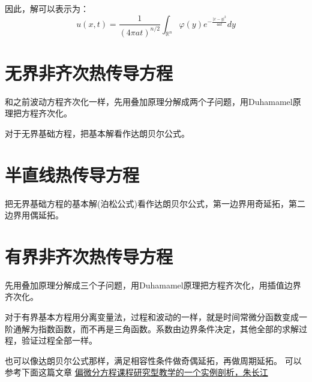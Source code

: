 \documentclass[12pt,a4paper]{article}
\numberwithin{subsection}{section}   %
\numberwithin{subsubsection}{subsection}
\theoremstyle{plain}
\theoremstyle{definition}
\theoremstyle{remark}
\theoremstyle{remark}
\begin{document}
	
	
	
	
	因此，解可以表示为：
	\begin{equation}
		u(x, t) = \frac{1}{(4\pi a t)^{n/2}} \int_{\mathbb{R}^n} \varphi(y) e^{-\frac{|x - y|^2}{4a t}} dy
	\end{equation}
	

	
		\newpage
	\section{无界非齐次热传导方程}
	和之前波动方程齐次化一样，先用叠加原理分解成两个子问题，用Duhamamel原理把方程齐次化。
	
	对于无界基础方程，把基本解看作达朗贝尔公式。
	
	\section{半直线热传导方程}
	把无界基础方程的基本解(泊松公式)看作达朗贝尔公式，第一边界用奇延拓，第二边界用偶延拓。
	
	
	\section{有界非齐次热传导方程}
	先用叠加原理分解成三个子问题，用Duhamamel原理把方程齐次化，用插值边界齐次化。
	
	对于有界基本方程用分离变量法，过程和波动的一样，就是时间常微分函数变成一阶通解为指数函数，而不再是三角函数。系数由边界条件决定，其他全部的求解过程，验证过程全部一样。
	
	也可以像达朗贝尔公式那样，满足相容性条件做奇偶延拓，再做周期延拓。
	可以参考下面这篇文章
\href{https://kns.cnki.net/kcms2/article/abstract?v=VQ0ntgfwFMTzN6hnFDpFMFM9DxAtYwMQhco2QSA-IEHGx9q5EylUyfVfvJ65vLbYgxi4GKWYtrw0WYFjulce4L-QdEJiwrbko6gMtLg1u_v-yZO9l1KqPNK5VVy0WXMK_iyRkdOb_3JYM79j78dC5ZO49R0B00eT_N_tEe4_tT88MKGKuKknjw==&uniplatform=NZKPT&language=CHS}{偏微分方程课程研究型教学的一个实例剖析，朱长江}
	
	
	
	
\end{document}
